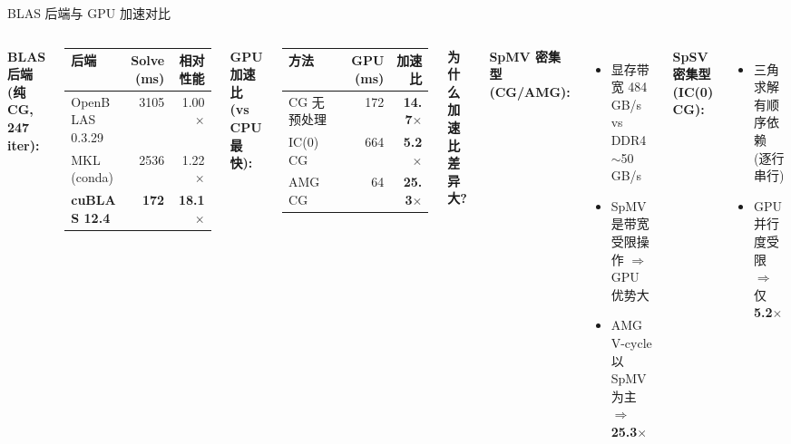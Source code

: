\documentclass[12pt,aspectratio=169]{beamer}
\begin{document}
\begin{frame}[shrink]{BLAS 后端与 GPU 加速对比}

\begin{columns}[T]
\textbf{BLAS 后端 (纯 CG, 247 iter):}

\vspace{2pt}
\footnotesize
\begin{tabular}{@{}l r r@{}}
\toprule
后端 & Solve (ms) & 相对性能 \\
\midrule
OpenBLAS 0.3.29 & 3105 & 1.00$\times$ \\
MKL (conda)     & 2536 & 1.22$\times$ \\
\textbf{cuBLAS 12.4} & \textbf{172} & \textbf{18.1$\times$} \\
\bottomrule
\end{tabular}

\vspace{6pt}
\small
\textbf{GPU 加速比 (vs CPU 最快):}

\vspace{2pt}
\footnotesize
\begin{tabular}{@{}l r r@{}}
\toprule
方法 & GPU (ms) & 加速比 \\
\midrule
CG 无预处理  & 172  & \textbf{14.7}$\times$ \\
IC(0) CG    & 664  & \textbf{5.2}$\times$ \\
AMG CG      & 64   & \textbf{25.3}$\times$ \\
\bottomrule
\end{tabular}

\small
\textbf{为什么加速比差异大?}

\vspace{4pt}
\textbf{SpMV 密集型 (CG/AMG):}
\begin{itemize}\itemsep0pt\footnotesize
  \item 显存带宽 484 GB/s vs DDR4 $\sim$50 GB/s
  \item SpMV 是带宽受限操作 $\Rightarrow$ GPU 优势大
  \item AMG V-cycle 以 SpMV 为主 $\Rightarrow$ \textbf{25.3}$\times$
\end{itemize}

\vspace{6pt}
\textbf{SpSV 密集型 (IC(0) CG):}
\begin{itemize}\itemsep0pt\footnotesize
  \item 三角求解有顺序依赖 (逐行串行)
  \item GPU 并行度受限 $\Rightarrow$ 仅 \textbf{5.2}$\times$
\end{itemize}


\end{columns}
\end{frame}
\end{document}
